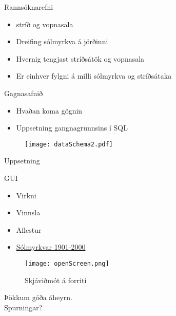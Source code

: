 \documentclass{rubeamer}
\begin{document}
\rutitleframe{}


\begin{frame}{Rannsóknarefni}
	\begin{itemize}
		\item stríð og vopnasala 
		\item Dreifing sólmyrkva á jörðinni
		\item Hvernig tengjast stríðsátök og vopnasala
		\item Er einhver fylgni á milli sólmyrkva og stríðsátaka
		
	\end{itemize}
\end{frame}

\begin{frame}{Gagnasafnið}
	\vspace{1em}
	\begin{itemize}
		\item Hvaðan koma gögnin
		\item Uppsetning gangnagrunnsins í SQL
	\end{itemize}
	
	\begin{figure}
		\centering
		\texttt{[image: dataSchema2.pdf]}
	\end{figure}
\end{frame}

\begin{frame}{Uppsetning }
	\vspace{1em}
	
\end{frame}

\begin{frame}{GUI}
	\begin{itemize}
		\item Virkni
		\item Vinnsla
		\item Aflestur
		\item \href{file:///C:/haukur/skoli/5.onn/gagnavinnsla/Gagnavinnsla.git/trunk/lokaverkefni/kynning/graphics/SpinningGlobe.gif}{Sólmyrkvar 1901-2000}
	\end{itemize}
	\begin{figure}
		\centering
		\texttt{[image: openScreen.png]}
		\caption*{Skjáviðmót á forriti}
	\end{figure}
\end{frame}

	
\begin{frame}
	\centering
	Þökkum góða áheyrn. \\
	Spurningar?\\
\end{frame}

\bibframe
\end{document}
